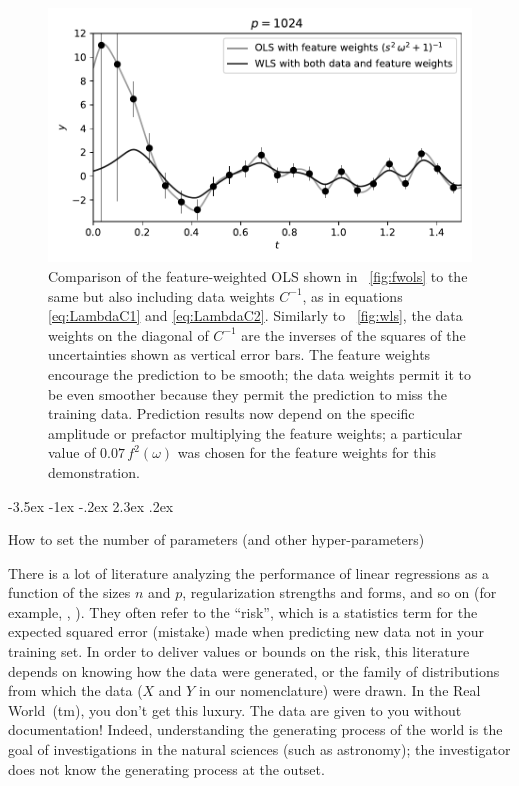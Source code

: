 \documentclass[12pt,letterpaper]{article}
\makeatletter
\newlength{\figurewidth}
\renewcommand\section{\@startsection {section}{1}{\z@}%
  {-3.5ex \@plus -1ex \@minus -.2ex}%
  {2.3ex \@plus.2ex}%
  {\raggedright\normalfont\Large\bfseries}}
\makeatother
\begin{document}
\begin{figure}[t]
    \begin{mdframed}
    \includegraphics[width=\figurewidth]{paper/weighted-WLS.pdf}
    \caption{Comparison of the feature-weighted OLS shown in \figurename~\ref{fig:fwols} to the same but also including data weights $C^{-1}$, as in equations \eqref{eq:LambdaC1} and \eqref{eq:LambdaC2}.
    Similarly to \figurename~\ref{fig:wls}, the data weights on the diagonal of $C^{-1}$ are the inverses of the squares of the uncertainties shown as vertical error bars. The feature weights encourage the prediction to be smooth; the data weights permit it to be even smoother because they permit the prediction to miss the training data.
    Prediction results now depend on the specific amplitude or prefactor multiplying the feature weights; a particular value of $0.07\,f^2(\omega)$ was chosen for the feature weights for this demonstration.}
    \label{fig:fwwls}
    \end{mdframed}
\end{figure}

\section{How to set the number of parameters (and other hyper-parameters)}\label{sec:dd}

There is a lot of literature analyzing the performance of linear regressions as a function of the sizes $n$ and $p$, regularization strengths and forms, and so on (for example, \citealt{bartlett2020benign}, \citealt{hastie2019surprises} ).
They often refer to the ``risk'', which is a statistics term for the expected squared error (mistake) made when predicting new data not in your training set.
In order to deliver values or bounds on the risk, this literature depends on knowing how the data were generated, or the family of distributions from which the data ($X$ and $Y$ in our nomenclature) were drawn.
In the Real World~(tm), you don't get this luxury.
The data are given to you without documentation!
Indeed, understanding the generating process of the world is the goal of investigations in the natural sciences (such as astronomy); the investigator does not know the generating process at the outset.
\end{document}
